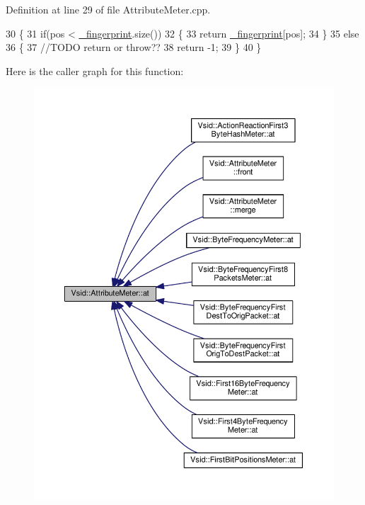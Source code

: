 Definition at line 29 of file Attribute\-Meter.\-cpp.


\begin{DoxyCode}
30 \{
31     \textcolor{keywordflow}{if}(pos < \hyperlink{class_vsid_1_1_attribute_meter_a0386b2fe9c5d6ab6fba16029d8da4efe}{\_fingerprint}.size())
32     \{
33         \textcolor{keywordflow}{return} \hyperlink{class_vsid_1_1_attribute_meter_a0386b2fe9c5d6ab6fba16029d8da4efe}{\_fingerprint}[pos];
34     \}
35     \textcolor{keywordflow}{else}
36     \{
37         \textcolor{comment}{//TODO return or throw??}
38         \textcolor{keywordflow}{return} -1;
39     \}
40 \}
\end{DoxyCode}


Here is the caller graph for this function\-:
\nopagebreak
\begin{figure}[H]
\begin{center}
\leavevmode
\includegraphics[width=350pt]{class_vsid_1_1_attribute_meter_a3b067be638ae613a732fa090c07c5e71_icgraph}
\end{center}
\end{figure}


